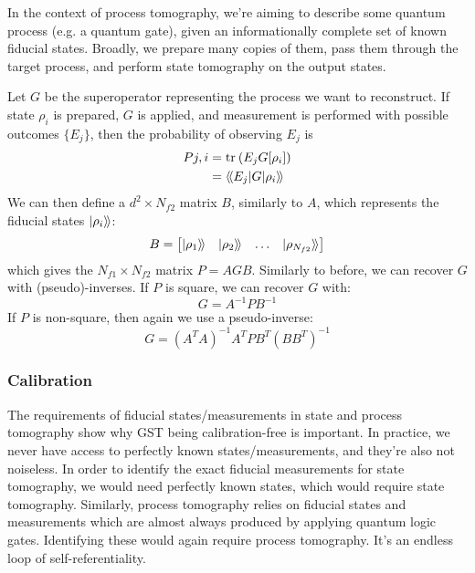 In the context of process tomography, we're aiming to describe some quantum process (e.g. a quantum
gate), given an informationally complete set of known fiducial states. Broadly,
we prepare many copies of them, pass them through the target process, and perform state tomography
on the output states.

Let $G$ be the superoperator representing the process we want to reconstruct. If state $\rho_i$ is
prepared, $G$ is applied, and measurement is performed with possible outcomes $\{E_j\}$, then the
probability of observing $E_j$ is
\begin{equation}
    \begin{aligned}
        P{j,i} &= \text{tr}_{}\left(E_j G[\rho_i]\right) \\
               &= \langle\!\braket{E_j | G | \rho_i}\!\rangle
    \end{aligned}
\end{equation}
We can then define a $d^2 \times N_{f2}$ matrix $B$, similarly to $A$, which represents the fiducial
states $\ket{\rho_i}\!\rangle$:
\begin{equation}
    B = 
    \begin{bmatrix}
        \ket{\rho_1}\!\rangle & \ket{\rho_2}\!\rangle & \dots & \ket{\rho_{N_{f2}}}\!\rangle
    \end{bmatrix}
\end{equation}
which gives the $N_{f1} \times N_{f2}$ matrix $P = AGB$. Similarly to before, we can recover $G$ with
(pseudo)-inverses. If $P$ is square, we can recover $G$ with:
\begin{equation}
    G = A^{-1} P B^{-1}
\end{equation}
If $P$ is non-square, then again we use a pseudo-inverse:
\begin{equation}
    G = (A^T A)^{-1} A^T P B^T (B B^T)^{-1}
\end{equation}

\subsubsection{Calibration}

The requirements of fiducial states/measurements in state and process tomography show why GST being
calibration-free is important. In practice, we never have access to perfectly known
states/measurements, and they're also not noiseless. In order to identify the exact fiducial
measurements for state tomography, we would need perfectly known states, which would require state
tomography.  Similarly, process tomography relies on fiducial states and measurements which are
almost always produced by applying quantum logic gates. Identifying these would again require
process tomography. It's an endless loop of self-referentiality.
